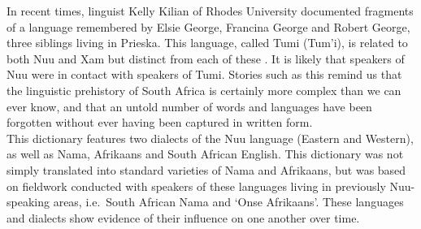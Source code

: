 In recent times, linguist Kelly Kilian of Rhodes University documented
fragments of a language remembered by Elsie George, Francina George
and Robert George, three siblings living in Prieska. This language,
called Tumi (Tum'i), is related to both
N\textipa{\textvertline}uu and \textipa{\textvertline}Xam but distinct
from each of these \parencite{Kilian2020}. It is likely that speakers
of N\textipa{\textvertline}uu were in contact with speakers of
Tumi. Stories such as this remind us that the linguistic
prehistory of South Africa is certainly more complex than we can ever
know, and that an untold number of words and languages have been
forgotten without ever having been captured in written form.\\

This dictionary features two dialects of the
N\textipa{\textvertline}uu language (Eastern and Western), as well as
Nama, Afrikaans and South African English. This dictionary was not
simply translated into standard varieties of Nama and Afrikaans, but
was based on fieldwork conducted with speakers of these languages
living in previously N\textipa{\textvertline}uu-speaking areas, i.e.\
South African Nama and `Onse Afrikaans'. These languages and dialects
show evidence of their influence on one another over time.\\


